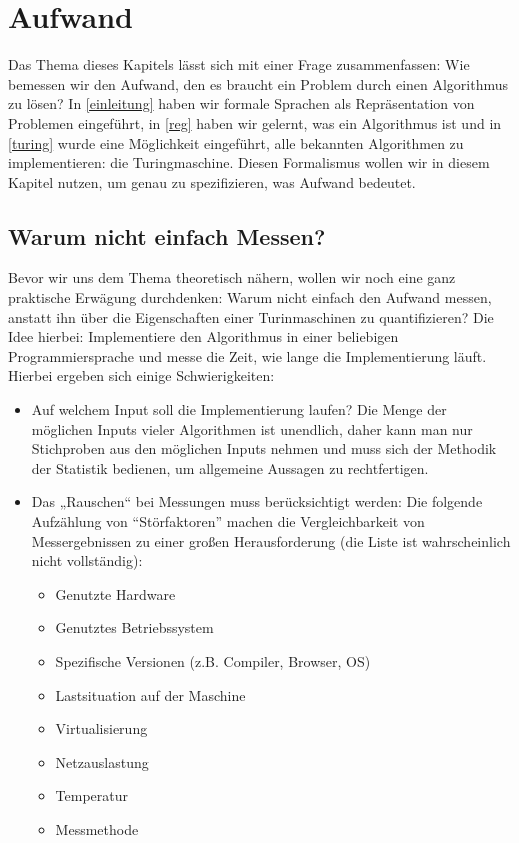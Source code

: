 \chapter{Aufwand}


Das Thema dieses Kapitels lässt sich mit einer Frage zusammenfassen:
Wie bemessen wir den Aufwand,
den es braucht ein Problem durch einen Algorithmus zu lösen?
In \autoref{einleitung} haben wir formale Sprachen als Repräsentation von Problemen eingeführt,
in \autoref{reg} haben wir gelernt, was ein Algorithmus ist und
in \autoref{turing} wurde eine Möglichkeit eingeführt,
alle bekannten Algorithmen zu implementieren:
die Turingmaschine.
Diesen Formalismus wollen wir in diesem Kapitel nutzen,
um genau zu spezifizieren,
was Aufwand bedeutet.

\section{Warum nicht einfach Messen?}\label{messenVsBeweisen}

Bevor wir uns dem Thema theoretisch nähern,
wollen wir noch eine ganz praktische Erwägung durchdenken:
Warum nicht einfach den Aufwand messen,
anstatt ihn über die Eigenschaften einer Turinmaschinen zu quantifizieren?
Die Idee hierbei:
Implementiere den Algorithmus in einer beliebigen Programmiersprache
und messe die Zeit,
wie lange die Implementierung läuft.
Hierbei ergeben sich einige Schwierigkeiten:
\begin{itemize}
  \item Auf welchem Input soll die Implementierung laufen?
      Die Menge der möglichen Inputs vieler Algorithmen ist unendlich,
      daher kann man nur Stichproben aus den möglichen Inputs nehmen
        und muss sich der Methodik der Statistik bedienen,
        um allgemeine Aussagen zu rechtfertigen.
    \item Das „Rauschen“ bei Messungen muss berücksichtigt werden:
        Die folgende Aufzählung von ``Störfaktoren'' machen
        die Vergleichbarkeit von Messergebnissen zu einer
        großen Herausforderung (die Liste ist wahrscheinlich nicht vollständig):
      \begin{itemize}
          \item Genutzte Hardware
          \item Genutztes Betriebssystem
          \item Spezifische Versionen (z.B. Compiler, Browser, OS)
          \item Lastsituation auf der Maschine
          \item Virtualisierung
          \item Netzauslastung
          \item Temperatur
          \item Messmethode
      \end{itemize}
\end{itemize}

